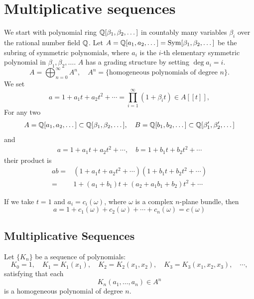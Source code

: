 \section{Multiplicative sequences}
\label{sec:multiplicative_sequences}

We start with polynomial ring $\mathbb{Q}[\beta_1,\beta_2,\dots]$ in countably many variables $\beta_i$ over the rational number field $\mathbb{Q}$. 
Let $A=\mathbb{Q}[a_1,a_2,\dots]=\mathrm{Sym}[\beta_1,\beta_2,\dots]$ be the subring of symmetric polynomials, 
where $a_i$ is the $i$-th elementary symmetric polynomial in $\beta_1,\beta_2,\dots$. $A$ has a grading structure by setting $\deg a_i=i$.
\begin{equation*}
    A=\bigoplus_{n=0}^{\infty} A^n, \quad A^n=\big\{\text{homogeneous polynomials of degree } n\big\}.
\end{equation*}
We set
\begin{equation*}
    a = 1 + a_1t + a_2t^2 + \cdots = \prod_{i=1}^{\infty} (1+\beta_it) \in A[[t]],
\end{equation*}
For any two 
\begin{gather*}
    A = \mathbb{Q}[a_1,a_2,\dots]\subset \mathbb{Q}[\beta_1,\beta_2,\dots], \quad B = \mathbb{Q}[b_1,b_2,\dots]\subset \mathbb{Q}[\beta_1',\beta_2',\dots]
\end{gather*}
and
\begin{gather*}
    a = 1 + a_1t + a_2t^2 + \cdots, \quad b = 1 + b_1t + b_2t^2 + \cdots
\end{gather*}
their product is 
\begin{align*}
    ab =& (1 + a_1t + a_2t^2 + \cdots)(1 + b_1t + b_2t^2 + \cdots) \\
    =& 1 + (a_1 + b_1)t + (a_2 + a_1b_1 + b_2)t^2 + \cdots
\end{align*}

\begin{remark}
    If we take $t=1$ and $a_i = c_i(\omega)$, where $\omega$ is a complex $n$-plane bundle, then 
    \begin{equation*}
        a = 1 + c_1(\omega) + c_2(\omega) + \cdots + c_n(\omega) = c(\omega)
    \end{equation*}
\end{remark}

\subsection{Multiplicative Sequences}
Let $\{K_n\}$ be a sequence of polynomials:
\begin{equation*}
    K_0 = 1, \quad K_1 = K_1(x_1), \quad K_2 = K_2(x_1,x_2), \quad K_3 = K_3(x_1,x_2,x_3), \quad \cdots,
\end{equation*} 
satisfying that each 
\begin{equation*}
    K_n(a_1,\dots,a_n)\in A^n
\end{equation*}
is a homogeneous polynomial of degree $n$. 

